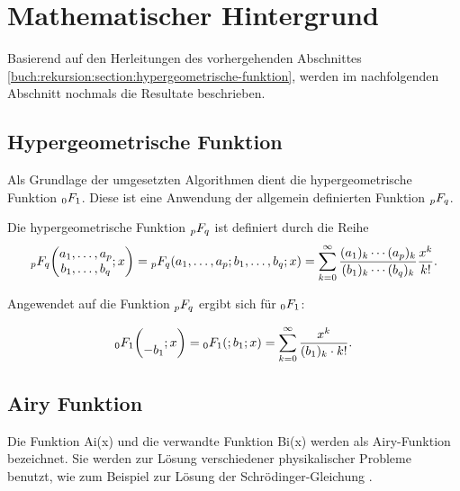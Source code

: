 %
%
%
\section{Mathematischer Hintergrund
\label{0f1:section:mathHintergrund}}
Basierend auf den Herleitungen des vorhergehenden Abschnittes \ref{buch:rekursion:section:hypergeometrische-funktion}, werden im nachfolgenden Abschnitt nochmals die Resultate
beschrieben.

\subsection{Hypergeometrische Funktion
\label{0f1:subsection:hypergeometrisch}}
Als Grundlage der umgesetzten Algorithmen dient die hypergeometrische Funktion $\mathstrut_0F_1$. Diese ist eine Anwendung der allgemein definierten Funktion $\mathstrut_pF_q$.

\begin{definition}
	\label{0f1:math:qFp:def}
	Die hypergeometrische Funktion
	$\mathstrut_pF_q$ ist definiert durch die Reihe
	\[
	\mathstrut_pF_q
	\biggl(
	\begin{matrix}
		a_1,\dots,a_p\\
		b_1,\dots,b_q
	\end{matrix}
	;
	x
	\biggr)
	=
	\mathstrut_pF_q(a_1,\dots,a_p;b_1,\dots,b_q;x)
	=
	\sum_{k=0}^\infty
	\frac{(a_1)_k\cdots(a_p)_k}{(b_1)_k\cdots(b_q)_k}\frac{x^k}{k!}.
	\]
\end{definition}

Angewendet auf die Funktion $\mathstrut_pF_q$ ergibt sich für $\mathstrut_0F_1$:

\begin{equation}
    \label{0f1:math:0f1:eq}
    \mathstrut_0F_1
    \biggl(
    \begin{matrix}
    \\-
    b_1
    \end{matrix}
    ;
    x
    \biggr)
    =
    \mathstrut_0F_1(;b_1;x)
    =
    \sum_{k=0}^\infty
    \frac{x^k}{(b_1)_k \cdot k!}.
\end{equation}




\subsection{Airy Funktion
\label{0f1:subsection:airy}}
Die Funktion Ai(x) und die verwandte Funktion Bi(x) werden als Airy-Funktion bezeichnet. Sie werden zur Lösung verschiedener physikalischer Probleme benutzt, wie zum Beispiel zur Lösung der Schrödinger-Gleichung \cite{0f1:wiki-airyFunktion}.

